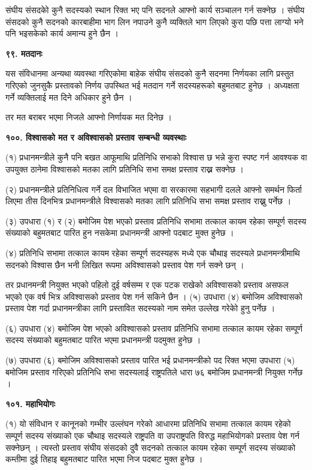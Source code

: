 संघीय संसदकोे कुनै सदस्यको स्थान रिक्त भए पनि सदनले आफ्नो कार्य सञ्चालन गर्न सक्नेछ । संघीय संसदको कुनै सदनको कारबाहीमा भाग लिन नपाउने कुनै व्यक्तिले भाग लिएको कुरा पछि पत्ता लाग्यो भने पनि भइसकेको कार्य अमान्य हुने छैन ।

\textbf{९९. मतदानः}

यस संविधानमा अन्यथा व्यवस्था गरिएकोमा बाहेक संघीय संसदको कुनै सदनमा निर्णयका लागि प्रस्तुत गरिएको जुनसुकै प्रस्तावको
निर्णय उपस्थित भई मतदान गर्ने सदस्यहरूको बहुमतबाट हुनेछ । अध्यक्षता गर्ने व्यक्तिलाई मत दिने अधिकार हुने छैन ।

तर मत बराबर भएमा निजले आफ्नो निर्णायक मत दिनेछ ।

\textbf{१००. विश्वासको मत र अविश्वासको प्रस्ताव सम्बन्धी व्यवस्थाः}

(१) प्रधानमन्त्रीले कुनै पनि बखत आफूमाथि प्रतिनिधि सभाको विश्वास छ भन्ने कुरा स्पष्ट गर्न आवश्यक वा उपयुक्त ठानेमा विश्वासको मतका लागि प्रतिनिधि सभा समक्ष प्रस्ताव राख्न सक्नेछ ।

(२) प्रधानमन्त्रीले प्रतिनिधित्व गर्ने दल विभाजित भएमा वा सरकारमा सहभागी दलले आफ्नो समर्थन फिर्ता लिएमा तीस दिनभित्र प्रधानमन्त्रीले विश्वासको मतका लागि प्रतिनिधि सभा समक्ष प्रस्ताव राख्नु पर्नेछ ।

(३) उपधारा (१) र (२) बमोजिम पेश भएको प्रस्ताव प्रतिनिधि सभामा तत्काल कायम रहेका सम्पूर्ण सदस्य संख्याको बहुमतबाट पारित हुन नसकेमा प्रधानमन्त्री आफ्नो पदबाट मुक्त हुनेछ ।

(४) प्रतिनिधि सभामा तत्काल कायम रहेका सम्पूर्ण सदस्यहरू मध्ये एक चौथाइ सदस्यले प्रधानमन्त्रीमाथि सदनको विश्वास छैन भनी लिखित रूपमा अविश्वासको प्रस्ताव पेश गर्न सक्ने छन् ।

तर प्रधानमन्त्री नियुक्त भएको पहिलो दुई वर्षसम्म र एक पटक राखेको अविश्वासको प्रस्ताव असफल भएको एक वर्ष भित्र अविश्वासको
प्रस्ताव पेश गर्न सकिने छैन । (५) उपधारा (४) बमोजिम अविश्वासको प्रस्ताव पेश गर्दा प्रधानमन्त्रीका लागि प्रस्तावित सदस्यको नाम समेत उल्लेख गरेकोे हुनु पर्नेछ ।

(६) उपधारा (४) बमोजिम पेश भएको अविश्वासको प्रस्ताव प्रतिनिधि सभामा तत्काल कायम रहेका सम्पूर्ण सदस्य संख्याको बहुमतबाट पारित भएमा प्रधानमन्त्री पदमुक्त हुनेछ ।

(७) उपधारा (६) बमोजिम अविश्वासको प्रस्ताव पारित भई प्रधानमन्त्रीको पद रिक्त भएमा उपधारा (५) बमोजिम प्रस्ताव गरिएको प्रतिनिधि सभा सदस्यलाई राष्ट्रपतिले धारा ७६ बमोजिम प्रधानमन्त्री नियुक्त गर्नेछ ।

\textbf{१०१. महाभियोगः}

(१) यो संविधान र कानूनको गम्भीर उल्लंघन गरेको आधारमा प्रतिनिधि सभामा तत्काल कायम रहेको सम्पूर्ण सदस्य संख्याको एक चौथाइ सदस्यले राष्ट्रपति वा उपराष्ट्रपति विरुद्ध महाभियोगको प्रस्ताव पेश गर्न सक्नेछन् । त्यस्तो प्रस्ताव संघीय संसदको दुवै सदनको तत्काल कायम रहेका सम्पूर्ण सदस्य संख्याको कम्तीमा दुई तिहाइ बहुमतबाट पारित भएमा निज पदबाट मुक्त हुनेछ ।

